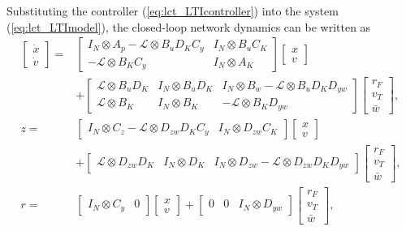 Substituting the controller (\ref{eq:lct_LTIcontroller}) into the system  (\ref{eq:lct_LTImodel}), the closed-loop network dynamics can be written as 
\begin{equation}\label{eq:lct_clLTIdynamic}
\begin{split}
\begin{bmatrix}
\dot{x}\\
\dot{v}
\end{bmatrix}
= &
\begin{bmatrix}
I_N \otimes A_p - \mathcal{L} \otimes B_uD_{K}C_y & I_N \otimes B_uC_K\\
- \mathcal{L} \otimes B_{K}C_y & I_N \otimes A_K
\end{bmatrix}
\begin{bmatrix}
x\\
v
\end{bmatrix} \\
& +
\begin{bmatrix}
\mathcal{L} \otimes B_uD_{K} & I_N \otimes B_uD_{K} & I_N\otimes B_w-\mathcal{L}\otimes B_uD_KD_{yw}\\
\mathcal{L} \otimes B_{K}  & I_N \otimes B_{K} & -\mathcal{L} \otimes B_KD_{yw}
\end{bmatrix}
\begin{bmatrix}
r_F \\
v_T\\
\bar{w}
\end{bmatrix}, \\
z= &
\begin{bmatrix}
I_N \otimes C_z - \mathcal{L}\otimes D_{zw}D_KC_y & I_N\otimes D_{zw}C_K
\end{bmatrix}
\begin{bmatrix}
x\\
v
\end{bmatrix} \\
& + 
\begin{bmatrix}
\mathcal{L}\otimes D_{zw}D_K & I_N\otimes D_K & I_N \otimes D_{zw} -\mathcal{L}\otimes D_{zw}D_KD_{yw}
\end{bmatrix}
\begin{bmatrix}
r_F\\
v_T\\
\bar{w}
\end{bmatrix},  \\
r = &
\begin{bmatrix}
I_N \otimes C_y & 0 
\end{bmatrix}
\begin{bmatrix}
x\\
v
\end{bmatrix} 
+
\begin{bmatrix}
0 & 0 & I_N \otimes D_{yw}  
\end{bmatrix}
\begin{bmatrix}
r_F\\
v_T\\
\bar{w}
\end{bmatrix},
\end{split}
\end{equation}
